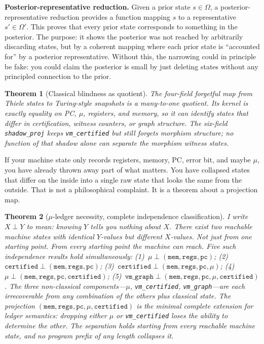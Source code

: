 \documentclass[11pt,a4paper]{article}
\theoremstyle{plain}
\newtheorem{theorem}{Theorem}[section]
\theoremstyle{definition}
\theoremstyle{remark}
\begin{document}
\medskip
\noindent\textbf{Posterior-representative reduction.}
Given a prior state $s \in \Omega$, a posterior-representative reduction provides a function mapping $s$ to a representative $s' \in \Omega'$. This proves that every prior state corresponds to something in the posterior. The purpose: it shows the posterior was not reached by arbitrarily discarding states, but by a coherent mapping where each prior state is ``accounted for'' by a posterior representative. Without this, the narrowing could in principle be fake: you could claim the posterior is small by just deleting states without any principled connection to the prior.

\begin{theorem}[Classical blindness as quotient]
The four-field forgetful map from Thiele states to Turing-style snapshots is a many-to-one quotient. Its kernel is exactly equality on PC, $\mu$, registers, and memory, so it can identify states that differ in certification, witness counters, or graph structure. The six-field \texttt{shadow\_proj} keeps \texttt{vm\_certified} but still forgets morphism structure; no function of that shadow alone can separate the morphism witness states.
\end{theorem}

If your machine state only records registers, memory, PC, error bit, and maybe $\mu$, you have already thrown away part of what matters. You have collapsed states that differ on the inside into a single raw state that looks the same from the outside. That is not a philosophical complaint. It is a theorem about a projection map.

\begin{theorem}[$\mu$-ledger necessity, complete independence classification]
I write $X \perp Y$ to mean: knowing $Y$ tells you nothing about $X$. There exist two reachable machine states with identical $Y$-values but different $X$-values. Not just from one starting point. From every starting point the machine can reach. Five such independence results hold simultaneously:
(1)~$\mu \perp (\texttt{mem}, \texttt{regs}, \texttt{pc})$;
(2)~$\texttt{certified} \perp (\texttt{mem}, \texttt{regs}, \texttt{pc})$;
(3)~$\texttt{certified} \perp (\texttt{mem}, \texttt{regs}, \texttt{pc}, \mu)$;
(4)~$\mu \perp (\texttt{mem}, \texttt{regs}, \texttt{pc}, \texttt{certified})$;
(5)~$\texttt{vm\_graph} \perp (\texttt{mem}, \texttt{regs}, \texttt{pc}, \mu, \texttt{certified})$.
The three non-classical components---$\mu$, \texttt{vm\_certified}, \texttt{vm\_graph}---are each irrecoverable from any combination of the others plus classical state. The projection $(\texttt{mem}, \texttt{regs}, \texttt{pc}, \mu, \texttt{certified})$ is the minimal complete extension for ledger semantics: dropping either $\mu$ or \texttt{vm\_certified} loses the ability to determine the other. The separation holds starting from every reachable machine state, and no program prefix of any length collapses it.
\end{theorem}
\end{document}
